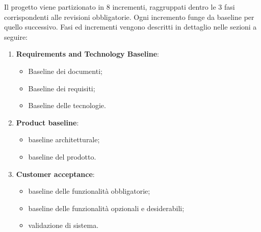 Il progetto viene partizionato in 8 incrementi, raggruppati dentro le 3 fasi corrispondenti alle revisioni obbligatorie. Ogni incremento funge da baseline per quello successivo. Fasi ed incrementi vengono descritti in dettaglio nelle sezioni a seguire:
\begin{enumerate}
    \item \textbf{Requirements and Technology Baseline}:
    \begin{itemize} 
    \item Baseline dei documenti;
    \item Baseline dei requisiti;
    \item Baseline delle tecnologie.
    \end{itemize}
    \item \textbf{Product baseline}:
    \begin{itemize} 
        \item baseline architetturale; 
        \item baseline del prodotto.
    \end{itemize}
    \item \textbf{Customer acceptance}:
    \begin{itemize}
        \item baseline delle funzionalità obbligatorie;
        \item baseline delle funzionalità opzionali e desiderabili;
        \item validazione di sistema.
    \end{itemize}
\end{enumerate}

